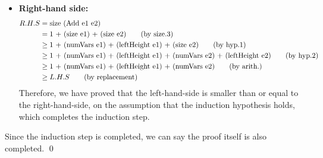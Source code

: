 \documentclass[11pt]{article}
\theoremstyle{definition}
\begin{document}
\begin{enumerate}
\begin{enumerate}
\begin{itemize}
\item \textbf{Right-hand side:}
\begin{align*}
R.H.S &= \text{size (Add e1 e2)} \\
      &= \text{1 + (size e1) + (size e2)} \tag{\text{by size.3}} \\
      &\geq \text{1 + (numVars e1) + (leftHeight e1) + (size e2)} \tag{\text{by hyp.1}} \\
      &\geq \text{1 + (numVars e1) + (leftHeight e1) + (numVars e2) + (leftHeight e2)} \tag{\text{by hyp.2}} \\
      &\geq \text{1 + (numVars e1) + (leftHeight e1) + (numVars e2)} \tag{\text{by arith.}} \\
      &\geq L.H.S \tag{\text{by replacement}}
\end{align*}
Therefore, we have proved that the left-hand-side is smaller than or equal to the right-hand-side,
on the assumption that the induction hypothesis holds, which completes the induction step.
\end{itemize}
Since the induction step is completed, we can say the proof itself is also completed. \qed
\end{enumerate}

\end{enumerate}
\end{document}
